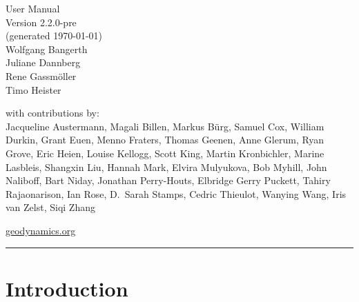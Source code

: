 \documentclass{article}
\begin{document}
{%
\color{dark_grey}
\hfill{\Huge \fontfamily{\sfdefault}\selectfont User Manual \\
\raggedleft \huge \fontfamily{\sfdefault}\selectfont Version
2.2.0-pre %
\\\large(generated \today)\\
{\Large Wolfgang Bangerth\\Juliane Dannberg\\Rene Gassm{\"o}ller\\Timo Heister\\}
}

\null
\vspace{17em}
\color{dark_grey}
{\fontfamily{\sfdefault}\selectfont
\large
\noindent with contributions by: \\
    Jacqueline Austermann,
    Magali Billen,
    Markus B{\"u}rg,
    Samuel Cox,
    William Durkin,
    Grant Euen,
    Menno Fraters,
    Thomas Geenen,
    Anne Glerum,
    Ryan Grove,
    Eric Heien,
    Louise Kellogg,
    Scott King,
    Martin Kronbichler,
    Marine Lasbleis,
    Shangxin Liu,
    Hannah Mark,
    Elvira Mulyukova,
    Bob Myhill,
    John Naliboff,
    Bart Niday,
    Jonathan Perry-Houts,
    Elbridge Gerry Puckett,
    Tahiry Rajaonarison,
    Ian Rose,
    D.~Sarah Stamps,
    Cedric Thieulot,
    Wanying Wang, 
    Iris van Zelst,
    Siqi Zhang \\
\vspace{1.0em}
}

{\noindent
{\fontfamily{\sfdefault}\selectfont \href{https://geodynamics.org}{geodynamics.org}}
}

{\noindent
\color{dark_grey}
\rule{\textwidth}{2pt}
}

}

\pagebreak
{}


\pagebreak

\tableofcontents

\pagebreak

\section{Introduction}
\end{document}
